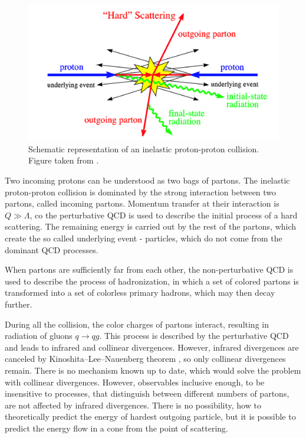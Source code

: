\begin{figure}[t]
  \centering
  \includegraphics[width=\textwidth]{Chapter2/HardProcess.png}
  \caption[Schematic representation of an inelastic proton-proton
          collision.]
          {Schematic representation of an inelastic proton-proton
          collision. Figure taken from \cite{HardProcess}.}
  \label{fig:HardProcess}
\end{figure}

Two incoming protons can be understood as two bags of partons. 
The inelastic proton-proton collision is dominated by the strong interaction
between two partons, called incoming partons. 
Momentum transfer at their interaction is $Q \gg \Lambda$, co the perturbative
QCD is used to describe the initial process of a hard scattering. 
The remaining energy is carried out by the rest of the partons, which create the so
called underlying event - particles, which do not come from the dominant QCD
processes.

When partons are sufficiently far from each other, the non-perturbative QCD is
used to describe the process of hadronization, in which a set of colored
partons is transformed into a set of colorless primary hadrons, which may then
decay further. 

During all the collision, the color charges of partons interact, resulting in
radiation of gluons $q \rightarrow qg$. This process is described by the
perturbative QCD and leads to infrared and collinear divergences. However,
infrared divergences are
canceled by Kinoshita--Lee--Nauenberg theorem \cite{KLN1,KLN2}, so only
collinear divergences remain. There is no mechanism known up to date, which
would solve the problem with collinear divergences. However, observables
inclusive enough, to be insensitive to processes, that distinguish between
different numbers of partons, are not affected by infrared divergences.
There is no possibility, how to theoretically predict the energy of hardest
outgoing particle, but it is possible to predict the energy flow in a cone from
the point of scattering.

